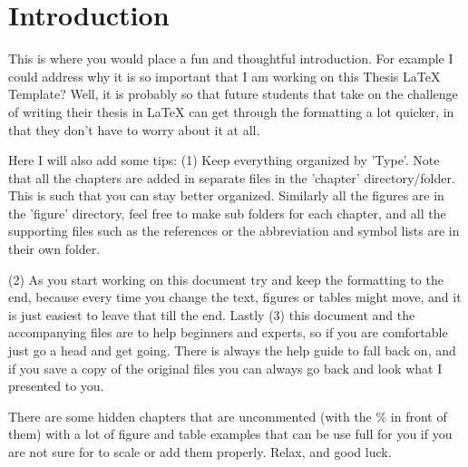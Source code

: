 \chapter{Introduction}\label{chap:intro}

This is where you would place a fun and thoughtful introduction. For example I could address why it is so important that I am working on this Thesis \LaTeX{} Template? Well, it is probably so that future students that take on the challenge of writing their thesis in \LaTeX{} can get through the formatting a lot quicker, in that they don't have to worry about it at all.

Here I will also add some tips: (1) Keep everything organized by 'Type'. Note that all the chapters are added in separate files in the 'chapter' directory/folder. This is such that you can stay better organized. Similarly all the figures are in the 'figure' directory, feel free to make sub folders for each chapter, and all the supporting files such as the references or the abbreviation and symbol lists are in their own folder. 

(2) As you start working on this document try and keep the formatting to the end, because every time you change the text, figures or tables might move, and it is just easiest to leave that till the end. Lastly (3) this document and the accompanying files are to help beginners and experts, so if you are comfortable just go a head and get going. There is always the help guide to fall back on, and if you save a copy of the original files you can always go back and look what I presented to you.

There are some hidden chapters that are uncommented (with the \% in front of them) with a lot of figure and table examples that can be use full for you if you are not sure for to scale or add them properly. Relax, and good luck.